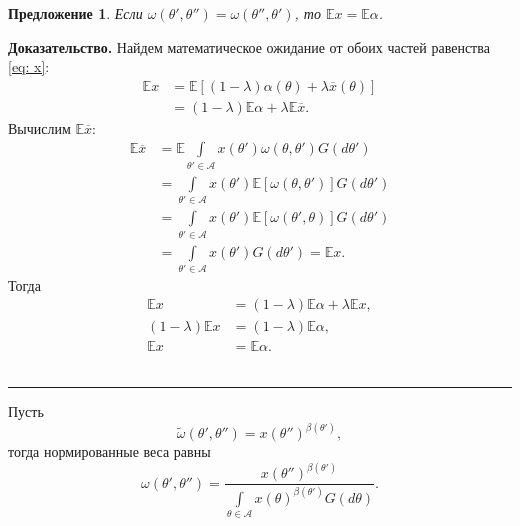 \documentclass[12pt]{article}
\newtheorem{proposition}{Предложение}
\newenvironment{proof}[1][Доказательство]{\noindent\textbf{#1.} }{\ \rule{0.5em}{0.5em}}
\begin{document}
\begin{proposition}
\label{th:ex}
Если $\omega(\theta', \theta'') = \omega(\theta'', \theta')$,  то $\mathbb{E} x = \mathbb{E} \alpha$.
\end{proposition}
\begin{proof}
Найдем математическое ожидание от обоих частей равенства \eqref{eq: x}:
\begin{align*}
\mathbb{E}x &= \mathbb{E} \left[(1-\lambda)\alpha(\theta) + \lambda \overline{x}(\theta) \right] \\
&= (1-\lambda) \mathbb{E} \alpha + \lambda \mathbb{E}  \overline{x}.
\end{align*}
Вычислим $\mathbb{E} \overline{x}$:
\begin{align*}
\mathbb{E} \overline{x} &= \mathbb{E} \int\limits_{\theta' \in \mathcal{A}} x(\theta') \omega(\theta, \theta') G(d \theta') \\
&=  \int\limits_{\theta' \in \mathcal{A}} x(\theta') \mathbb{E} \left[ \omega(\theta, \theta') \right] G(d \theta') \\ 
&=  \int\limits_{\theta' \in \mathcal{A}} x(\theta') \mathbb{E} \left[ \omega(\theta', \theta) \right] G(d \theta') \\
&=  \int\limits_{\theta' \in \mathcal{A}} x(\theta') G(d \theta') = \mathbb{E} x.
\end{align*}
Тогда 
\begin{align*}
\mathbb{E}x &= (1-\lambda) \mathbb{E} \alpha + \lambda \mathbb{E} x,\\
(1-\lambda)\mathbb{E}x &=(1-\lambda) \mathbb{E}\alpha, \\
\mathbb{E}x &=  \mathbb{E}\alpha.
\end{align*}
\end{proof}

Пусть 
$$
\tilde{\omega}(\theta', \theta'') = x(\theta'')^{\beta(\theta')},
$$
тогда нормированные веса равны
\begin{equation}
\label{eq:weight}
\omega(\theta', \theta'') = \frac{x(\theta'')^{\beta(\theta')}}{\int\limits_{\theta \in \mathcal{A}} x(\theta)^{\beta(\theta')}G(d \theta)}.
\end{equation}
\end{document}
